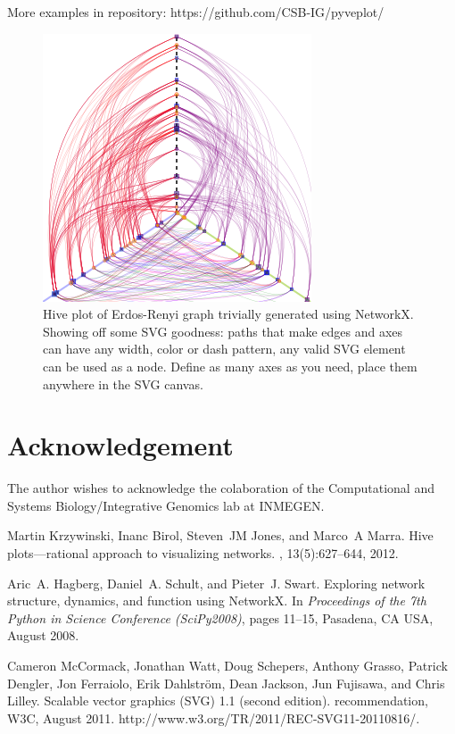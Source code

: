 \documentclass{bioinfo}
\begin{document}
More examples in repository: https://github.com/CSB-IG/pyveplot/


\begin{figure}
  \centerline{\includegraphics{example.png}}
  \caption{Hive plot of Erdos-Renyi graph trivially generated using
    NetworkX. Showing off some SVG goodness: paths that make edges
    and axes can have any width, color or dash pattern, any valid SVG
    element can be used as a node. Define as many axes as you need,
    place them anywhere in the SVG canvas.}
  \label{fig:01}
\end{figure}

\section*{Acknowledgement}
The author wishes to acknowledge the colaboration of the Computational and Systems
Biology/Integrative Genomics lab at INMEGEN.


\begin{thebibliography}{3}

Martin Krzywinski, Inanc Birol, Steven~JM Jones, and Marco~A Marra.
\newblock Hive plots—rational approach to visualizing networks.
, 13(5):627--644, 2012.


Aric~A. Hagberg, Daniel~A. Schult, and Pieter~J. Swart.
\newblock Exploring network structure, dynamics, and function using {NetworkX}.
\newblock In {\em Proceedings of the 7th Python in Science Conference
  (SciPy2008)}, pages 11--15, Pasadena, CA USA, August 2008.


Cameron McCormack, Jonathan Watt, Doug Schepers, Anthony Grasso, Patrick
  Dengler, Jon Ferraiolo, Erik Dahlstr{\"{o}}m, Dean Jackson, Jun Fujisawa, and
  Chris Lilley.
\newblock Scalable vector graphics ({SVG}) {1.1} (second edition).
 recommendation, W3C, August 2011.
\newblock http://www.w3.org/TR/2011/REC-SVG11-20110816/.

\end{thebibliography}
\end{document}
